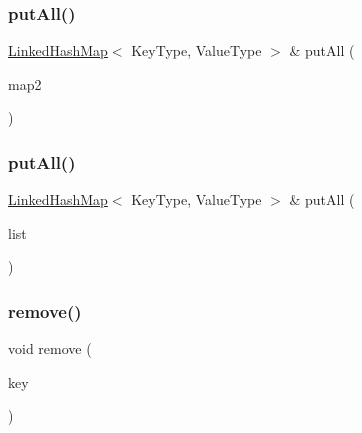 \subsubsection{\texorpdfstring{put\+All()}{putAll()}\hspace{0.1cm}{\footnotesize\ttfamily [1/2]}}
{\footnotesize\ttfamily \mbox{\hyperlink{classLinkedHashMap}{Linked\+Hash\+Map}}$<$ Key\+Type, Value\+Type $>$ \& put\+All (\begin{DoxyParamCaption}\item[{const \mbox{\hyperlink{classLinkedHashMap}{Linked\+Hash\+Map}}$<$ Key\+Type, Value\+Type $>$ \&}]{map2 }\end{DoxyParamCaption})}

\mbox{\label{classLinkedHashMap_a8cb591b953a8e479b178b4ed111f39e8}} 
\subsubsection{\texorpdfstring{put\+All()}{putAll()}\hspace{0.1cm}{\footnotesize\ttfamily [2/2]}}
{\footnotesize\ttfamily \mbox{\hyperlink{classLinkedHashMap}{Linked\+Hash\+Map}}$<$ Key\+Type, Value\+Type $>$ \& put\+All (\begin{DoxyParamCaption}\item[{std\+::initializer\+\_\+list$<$ std\+::pair$<$ Key\+Type, Value\+Type $>$ $>$}]{list }\end{DoxyParamCaption})}

\mbox{\label{classLinkedHashMap_ac6e7e5198a9f1c8b2cc40fbd1d0eb3b0}} 
\subsubsection{\texorpdfstring{remove()}{remove()}}
{\footnotesize\ttfamily void remove (\begin{DoxyParamCaption}\item[{const Key\+Type \&}]{key }\end{DoxyParamCaption})}

\mbox{\label{classLinkedHashMap_a192b64f541a02885811d43505ac99d6f}} 
